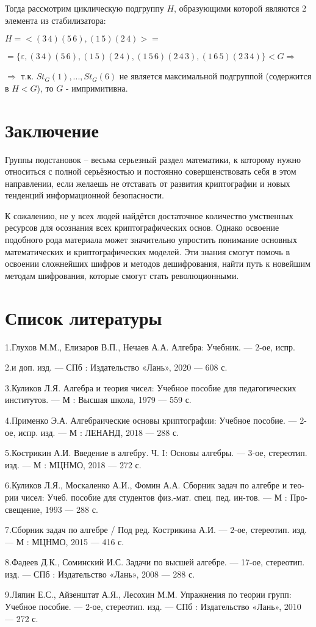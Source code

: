 \documentclass[utf8,14pt,a4paper,oneside,russian]{book}
\begin{document}
	Тогда рассмотрим циклическую подгруппу $H$, образующими которой являются 2 элемента из стабилизатора:
	
	$H=<(3\,4)(5\,6),(1\,5)(2\,4)>=$
	
	$=\{\varepsilon,(3\,4)(5\,6),(1\,5)(2\,4),(1\,5\,6)(2\,4\,3),(1\,6\,5)(2\,3\,4)\}<G\Rightarrow$

	$\Rightarrow$ т.к. $St_{G}(1),...,St_{G}(6)$ не является максимальной подгруппой (содержится в $H<G$), то $G$ - импримитивна.
	\newpage
	\section{Заключение}
	Группы подстановок – весьма серьезный раздел математики, к которому нужно относиться с полной серьёзностью и постоянно совершенствовать себя в этом направлении, если желаешь не отставать от развития криптографии и новых тенденций информационной безопасности.
	
	К сожалению, не у всех людей найдётся достаточное количество умственных ресурсов для осознания всех криптографических основ. Однако освоение подобного рода материала может значительно упростить понимание основных математических и криптографических моделей. Эти знания смогут помочь в освоении сложнейших шифров и методов дешифрования, найти путь к новейшим методам шифрования, которые смогут стать революционными.
	
	\newpage
	
	\section{Список литературы}
	
	1.Глухов М.М., Елизаров В.П., Нечаев А.А. Алгебра: Учебник. — 2-ое, испр.
	
	2.и доп. изд. — СПб : Издательство «Лань», 2020 — 608 с.
	
	3.Куликов Л.Я. Алгебра и теория чисел: Учебное пособие для педагогических
	институтов. — М : Высшая школа, 1979 — 559 с.
	
	4.Применко Э.А. Алгебраические основы криптографии: Учебное пособие. —
	2-ое, испр. изд. — М : ЛЕНАНД, 2018 — 288 с.
	
	5.Кострикин А.И. Введение в алгебру. Ч. I: Основы алгебры. — 3-ое, стереотип.
	изд. — М : МЦНМО, 2018 — 272 с.
	
	6.Куликов Л.Я., Москаленко А.И., Фомин А.А. Сборник задач по алгебре и тео-
	рии чисел: Учеб. пособие для студентов физ.-мат. спец. пед. ин-тов. — М : Про-
	свещение, 1993 — 288 с.
	
	7.Сборник задач по алгебре / Под ред. Кострикина А.И. — 2-ое, стереотип. изд.
	— М : МЦНМО, 2015 — 416 с.
	
	8.Фадеев Д.К., Соминский И.С. Задачи по высшей алгебре. — 17-ое, стереотип.
	изд. — СПб : Издательство «Лань», 2008 — 288 с.
	
	9.Ляпин Е.С., Айзенштат А.Я., Лесохин М.М. Упражнения по теории групп:
	Учебное пособие. — 2-ое, стереотип. изд. — СПб : Издательство «Лань», 2010
	— 272 с.
		
\end{document}
